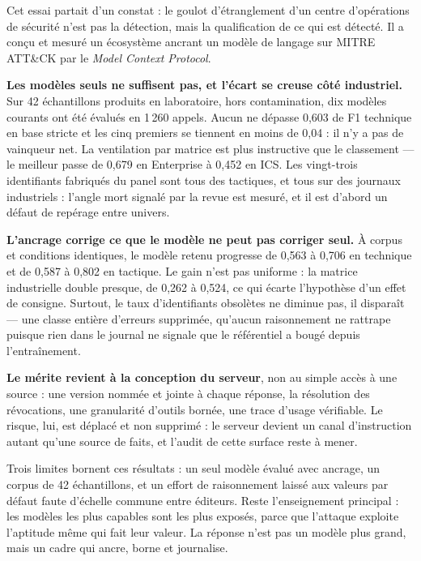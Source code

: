 
\label{chap:conclusion}

Cet essai partait d'un constat : le goulot d'étranglement d'un centre
d'opérations de sécurité n'est pas la détection, mais la qualification de ce qui
est détecté. Il a conçu et mesuré un écosystème ancrant un modèle de langage sur
MITRE ATT\&CK par le \emph{Model Context Protocol}.

\textbf{Les modèles seuls ne suffisent pas, et l'écart se creuse côté
industriel.} Sur 42 échantillons produits en laboratoire, hors contamination, dix
modèles courants ont été évalués en 1\,260 appels. Aucun ne dépasse 0,603 de F1
technique en base stricte et les cinq premiers se tiennent en moins de 0,04 : il
n'y a pas de vainqueur net. La ventilation par matrice est plus instructive que
le classement --- le meilleur passe de 0,679 en Enterprise à 0,452 en ICS. Les
vingt-trois identifiants fabriqués du panel sont tous des tactiques, et tous sur
des journaux industriels : l'angle mort signalé par la revue est mesuré, et il
est d'abord un défaut de repérage entre univers.

\textbf{L'ancrage corrige ce que le modèle ne peut pas corriger seul.} À corpus
et conditions identiques, le modèle retenu progresse de 0,563 à 0,706 en
technique et de 0,587 à 0,802 en tactique. Le gain n'est pas uniforme : la
matrice industrielle double presque, de 0,262 à 0,524, ce qui écarte
l'hypothèse d'un effet de consigne. Surtout, le taux d'identifiants obsolètes ne
diminue pas, il disparaît --- une classe entière d'erreurs supprimée, qu'aucun
raisonnement ne rattrape puisque rien dans le journal ne signale que le
référentiel a bougé depuis l'entraînement.

\textbf{Le mérite revient à la conception du serveur}, non au simple accès à une
source : une version nommée et jointe à chaque réponse, la résolution des
révocations, une granularité d'outils bornée, une trace d'usage vérifiable. Le
risque, lui, est déplacé et non supprimé : le serveur devient un canal
d'instruction autant qu'une source de faits, et l'audit de cette surface reste à
mener.

Trois limites bornent ces résultats : un seul modèle évalué avec ancrage, un
corpus de 42 échantillons, et un effort de raisonnement laissé aux valeurs par
défaut faute d'échelle commune entre éditeurs. Reste l'enseignement principal :
les modèles les plus capables sont les plus exposés, parce que l'attaque exploite
l'aptitude même qui fait leur valeur. La réponse n'est pas un modèle plus grand,
mais un cadre qui ancre, borne et journalise.
